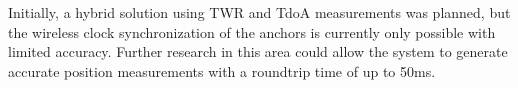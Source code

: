 \documentclass[conference, a4paper]{IEEEtran}
\begin{document}
Initially, a hybrid solution using \ac{TWR} and \ac{TdoA} measurements was planned,
but the wireless clock synchronization of the anchors is currently only possible with limited accuracy.
Further research in this area could allow the system to generate accurate position measurements with a roundtrip time of up to 50ms.




 
\end{document}
